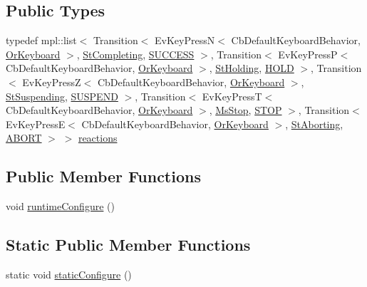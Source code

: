 \subsection*{Public Types}
\begin{DoxyCompactItemize}
\item 
typedef mpl\+::list$<$ Transition$<$ Ev\+Key\+PressN$<$ Cb\+Default\+Keyboard\+Behavior, \hyperlink{classsm__packML_1_1OrKeyboard}{Or\+Keyboard} $>$, \hyperlink{structsm__packML_1_1StCompleting}{St\+Completing}, \hyperlink{classSUCCESS}{S\+U\+C\+C\+E\+SS} $>$, Transition$<$ Ev\+Key\+PressP$<$ Cb\+Default\+Keyboard\+Behavior, \hyperlink{classsm__packML_1_1OrKeyboard}{Or\+Keyboard} $>$, \hyperlink{structsm__packML_1_1StHolding}{St\+Holding}, \hyperlink{structsm__packML_1_1StExecute_1_1HOLD}{H\+O\+LD} $>$, Transition$<$ Ev\+Key\+PressZ$<$ Cb\+Default\+Keyboard\+Behavior, \hyperlink{classsm__packML_1_1OrKeyboard}{Or\+Keyboard} $>$, \hyperlink{structsm__packML_1_1StSuspending}{St\+Suspending}, \hyperlink{structsm__packML_1_1StExecute_1_1SUSPEND}{S\+U\+S\+P\+E\+ND} $>$, Transition$<$ Ev\+Key\+PressT$<$ Cb\+Default\+Keyboard\+Behavior, \hyperlink{classsm__packML_1_1OrKeyboard}{Or\+Keyboard} $>$, \hyperlink{classsm__packML_1_1MsStop}{Ms\+Stop}, \hyperlink{structsm__packML_1_1StExecute_1_1STOP}{S\+T\+OP} $>$, Transition$<$ Ev\+Key\+PressE$<$ Cb\+Default\+Keyboard\+Behavior, \hyperlink{classsm__packML_1_1OrKeyboard}{Or\+Keyboard} $>$, \hyperlink{structsm__packML_1_1StAborting}{St\+Aborting}, \hyperlink{classABORT}{A\+B\+O\+RT} $>$ $>$ \hyperlink{structsm__packML_1_1StExecute_ad5e5ad84974f2f723cd1b9914ab161da}{reactions}
\end{DoxyCompactItemize}
\subsection*{Public Member Functions}
\begin{DoxyCompactItemize}
\item 
void \hyperlink{structsm__packML_1_1StExecute_abf9c1ff5494fcb8aa62aca1c032e986a}{runtime\+Configure} ()
\end{DoxyCompactItemize}
\subsection*{Static Public Member Functions}
\begin{DoxyCompactItemize}
\item 
static void \hyperlink{structsm__packML_1_1StExecute_aa6be62163d90d338b72d08c3837fb97c}{static\+Configure} ()
\end{DoxyCompactItemize}
